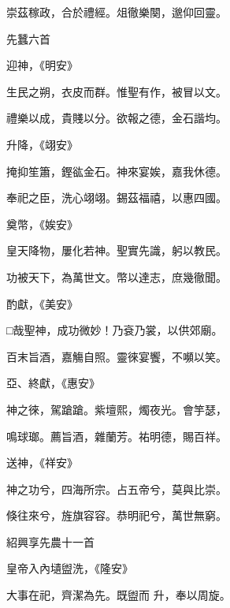 \begin{pinyinscope}
 崇茲稼政，合於禮經。俎徹樂闋，邈仰回靈。



 先蠶六首



 迎神，《明安》



 生民之朔，衣皮而群。惟聖有作，被冒以文。



 禮樂以成，貴賤以分。欲報之德，金石諧均。



 升降，《翊安》



 掩抑笙簫，鏗谹金石。神來宴娭，嘉我休德。



 奉祀之臣，洗心翊翊。錫茲福禧，以惠四國。



 奠幣，《娭安》



 皇天降物，屢化若神。聖實先識，躬以教民。



 功被天下，為萬世文。幣以達志，庶幾徹聞。



 酌獻，《美安》



 □哉聖神，成功微妙！乃袞乃裳，以供郊廟。



 百末旨酒，嘉觴自照。靈徠宴饗，不嚬以笑。



 亞、終獻，《惠安》



 神之徠，駕蹌蹌。紫壇熙，燭夜光。會竽瑟，



 鳴球瑯。薦旨酒，雜蘭芳。祐明德，賜百祥。



 送神，《祥安》



 神之功兮，四海所宗。占五帝兮，莫與比崇。



 倏往來兮，旌旗容容。恭明祀兮，萬世無窮。



 紹興享先農十一首



 皇帝入內壝盥洗，《隆安》



 大事在祀，齊潔為先。既盥而
 升，奉以周旋。




\end{pinyinscope}
